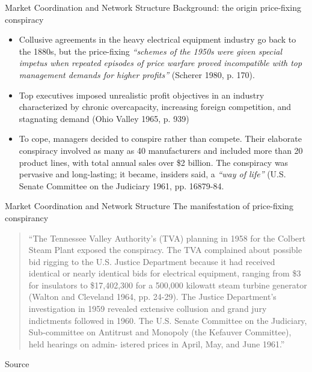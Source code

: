 \documentclass[notes, aspectratio=1610]{beamer}
\begin{document}
\begin{frame}{Market Coordination and Network Structure}
	{Background: the origin price-fixing conspiracy}
	\small
	\begin{itemize}
		\item 
		Collusive agreements in the heavy electrical equipment industry go back 
		to the 1880s, but the price-fixing \textit{``schemes of the 1950s were given 
		special impetus when repeated episodes of price warfare proved 
		incompatible with top management demands for higher profits''} (Scherer 
		1980, p. 170).
	        \item 	
		Top executives imposed unrealistic profit objectives in an industry 
		characterized by chronic overcapacity, increasing foreign competition, 
		and stagnating demand (Ohio Valley 1965, p. 939)
		\item 
		To cope, managers 
		decided to conspire rather than compete. Their elaborate conspiracy 
		involved as many as 40 manufacturers and included more than 20 product 
		lines, with total annual sales over \$2 billion. The conspiracy was 
		pervasive and long-lasting; it became, insiders said, a \textit{``way of life''}
		(U.S. Senate Committee on the Judiciary 1961, pp. 16879-84.
	\end{itemize}
\end{frame}

\begin{frame}{Market Coordination and Network Structure}
	{The manifestation of price-fixing conspirancy}
	\begin{quote}
	``The Tennessee Valley Authority's (TVA) planning in 1958 for the
	Colbert Steam Plant exposed the conspiracy. The TVA complained about
	possible bid rigging to the U.S. Justice Department because it had
	received identical or nearly identical bids for electrical equipment,
	ranging from \$3 for insulators to \$17,402,300 for a 500,000 kilowatt
	steam turbine generator (Walton and Cleveland 1964, pp. 24-29). The
	Justice Department's investigation in 1959 revealed extensive
	collusion and grand jury indictments followed in 1960. The U.S. Senate
	Committee on the Judiciary, Sub-committee on Antitrust and Monopoly
	(the Kefauver Committee), held hearings on admin- istered prices in
	April, May, and June 1961.''
	\end{quote}
	
	Source~\cite[][page 838]{baker_faulkner_1993}
\end{frame}
\end{document}
